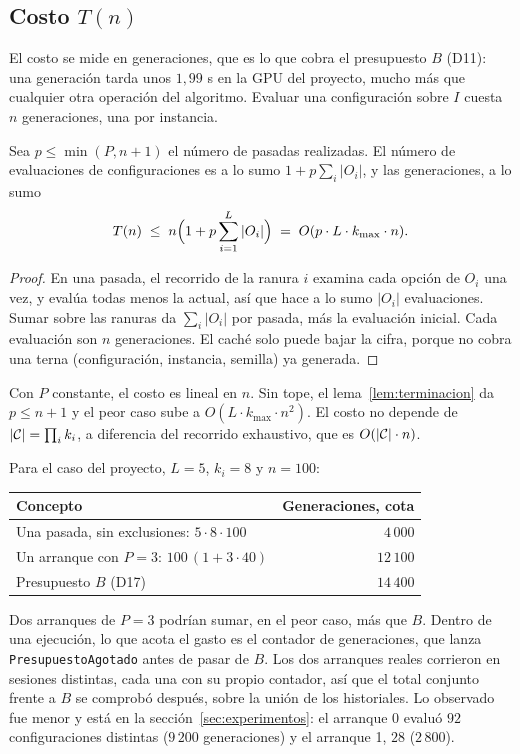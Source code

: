 \subsection{Costo $T(n)$}

El costo se mide en generaciones, que es lo que cobra el presupuesto $B$ (D11): una
generación tarda unos $1{,}99$ s en la GPU del proyecto, mucho más que cualquier otra
operación del algoritmo. Evaluar una configuración sobre $I$ cuesta $n$ generaciones, una
por instancia.

\begin{teorema}[Costo]\label{teo:costo}
Sea $p\le\min(P,n+1)$ el número de pasadas realizadas. El número de evaluaciones de
configuraciones es a lo sumo $1+p\sum_i|O_i|$, y las generaciones, a lo sumo
\[
  T(n)\;\le\; n\Bigl(1+p\sum_{i=1}^{L}|O_i|\Bigr)\;=\;O(p\cdot L\cdot k_{\max}\cdot n).
\]
\end{teorema}
\begin{proof}
En una pasada, el recorrido de la ranura $i$ examina cada opción de $O_i$ una vez, y
evalúa todas menos la actual, así que hace a lo sumo $|O_i|$ evaluaciones. Sumar sobre las
ranuras da $\sum_i|O_i|$ por pasada, más la evaluación inicial. Cada evaluación son $n$
generaciones. El caché solo puede bajar la cifra, porque no cobra una terna
(configuración, instancia, semilla) ya generada.
\end{proof}

Con $P$ constante, el costo es lineal en $n$. Sin tope, el lema~\ref{lem:terminacion} da
$p\le n+1$ y el peor caso sube a $O(L\cdot k_{\max}\cdot n^2)$. El costo no depende de
$|\mathcal{C}|=\prod_i k_i$, a diferencia del recorrido exhaustivo, que es $O(|\mathcal{C}|\cdot n)$.

Para el caso del proyecto, $L=5$, $k_i=8$ y $n=100$:
\begin{center}
\begin{tabular}{lr}
\toprule
Concepto & Generaciones, cota \\
\midrule
Una pasada, sin exclusiones: $5\cdot 8\cdot 100$ & $4\,000$ \\
Un arranque con $P=3$: $100\,(1+3\cdot 40)$ & $12\,100$ \\
Presupuesto $B$ (D17) & $14\,400$ \\
\bottomrule
\end{tabular}
\end{center}
Dos arranques de $P=3$ podrían sumar, en el peor caso, más que $B$. Dentro de una
ejecución, lo que acota el gasto es el contador de generaciones, que lanza
\texttt{PresupuestoAgotado} antes de pasar de $B$. Los dos arranques reales corrieron en
sesiones distintas, cada una con su propio contador, así que el total conjunto frente a $B$
se comprobó después, sobre la unión de los historiales. Lo observado fue menor y está en la sección~\ref{sec:experimentos}: el arranque 0 evaluó
$92$ configuraciones distintas ($9\,200$ generaciones) y el arranque 1, $28$ ($2\,800$).

